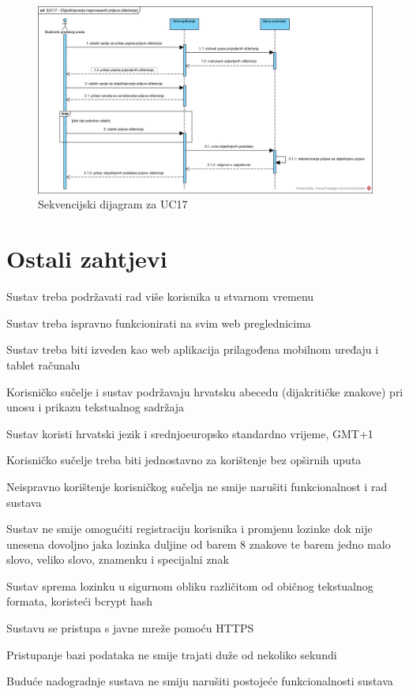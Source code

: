 \begin{figure}[H]
	\includegraphics[scale=0.5]{slike/UC17_sekvencijski.jpg} %
	\centering
	\caption{Sekvencijski dijagram za UC17}
	\label{fig:SekvencijskiDijagramObjedinjavanjeNepovezanihPrijavaOštećenja}
\end{figure}

\eject

\section{Ostali zahtjevi}

\begin{packed_enum}
	\item Sustav treba podržavati rad više korisnika u stvarnom vremenu
	\item Sustav treba ispravno funkcionirati na svim web preglednicima
	\item Sustav treba biti izveden kao web aplikacija prilagođena mobilnom uređaju i tablet računalu
	\item Korisničko sučelje i sustav podržavaju hrvatsku abecedu (dijakritičke znakove) pri unosu i prikazu tekstualnog sadržaja
	\item Sustav koristi hrvatski jezik i srednjoeuropsko standardno vrijeme, GMT+1
	\item Korisničko sučelje treba biti jednostavno za korištenje bez opširnih uputa
	\item Neispravno korištenje korisničkog sučelja ne smije narušiti funkcionalnost i rad sustava 
	\item Sustav ne smije omogućiti registraciju korisnika i promjenu lozinke dok nije unesena dovoljno jaka lozinka duljine od barem 8 znakove te barem jedno malo slovo, veliko slovo, znamenku i specijalni znak
	\item Sustav sprema lozinku u sigurnom obliku različitom od običnog tekstualnog formata, koristeći bcrypt hash
	\item Sustavu se pristupa s javne mreže pomoću HTTPS
	\item Pristupanje bazi podataka ne smije trajati duže od nekoliko sekundi
	\item Buduće nadogradnje sustava ne smiju narušiti postojeće funkcionalnosti sustava
\end{packed_enum}

